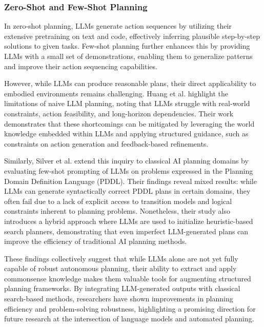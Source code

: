 \subsubsection{Zero-Shot and Few-Shot Planning}
In zero-shot planning, LLMs generate action sequences by utilizing their extensive
pretraining on text and code, effectively inferring plausible step-by-step
solutions to given tasks. Few-shot planning further enhances this by providing LLMs
with a small set of demonstrations, enabling them to generalize patterns and
improve their action sequencing capabilities.

However, while LLMs can produce reasonable plans, their direct applicability to
embodied environments remains challenging. Huang et al.
\cite{huang2022languagemodelszeroshotplanners} highlight the limitations of
naive LLM planning, noting that LLMs struggle with real-world constraints,
action feasibility, and long-horizon dependencies. Their work demonstrates that
these shortcomings can be mitigated by leveraging the world knowledge embedded
within LLMs and applying structured guidance, such as constraints on action generation
and feedback-based refinements.

Similarly, Silver et al. \cite{silver2022pddl} extend this inquiry to classical AI
planning domains by evaluating few-shot prompting of LLMs on problems expressed in
the Planning Domain Definition Language (PDDL). Their findings reveal mixed
results: while LLMs can generate syntactically correct PDDL plans in certain domains,
they often fail due to a lack of explicit access to transition models and
logical constraints inherent to planning problems. Nonetheless, their study also
introduces a hybrid approach where LLMs are used to initialize heuristic-based
search planners, demonstrating that even imperfect LLM-generated plans can improve
the efficiency of traditional AI planning methods.

These findings collectively suggest that while LLMs alone are not yet fully capable
of robust autonomous planning, their ability to extract and apply commonsense
knowledge makes them valuable tools for augmenting structured planning
frameworks. By integrating LLM-generated outputs with classical search-based methods,
researchers have shown improvements in planning efficiency and problem-solving
robustness, highlighting a promising direction for future research at the intersection
of language models and automated planning.

